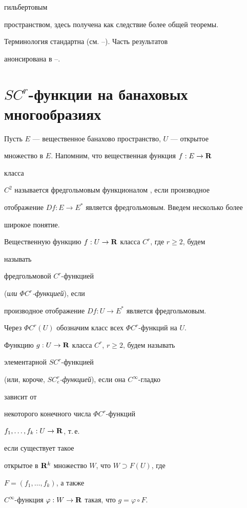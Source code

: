 гильбертовым


пространством, здесь получена как следствие более общей теоремы.


Терминология стандартна (см. \cite{6}--\cite{9}). Часть результатов


анонсирована в \cite{10}--\cite{13}.





\section{$SC^r$-функции на банаховых многообразиях}





Пусть $E$ --- вещественное банахово пространство, $U$ --- открытое


множество в $E$. Напомним, что вещественная функция $f:E\to\bold R$


класса


$C^2$ называется фредгольмовым функционалом \cite{14}, если производное


отображение $Df:E\to E^*$ является фредгольмовым. Введем несколько более


широкое понятие.





\begin{defns}


Вещественную функцию $f:U\to\bold R$ класса $C^r$, где $r\ge 2$, будем


называть {\em


фредгольмовой $C^r$-функцией} ({\em или $\Phi C^r$-функцией}), если


производное отображение $Df:U\to E^*$ является фредгольмовым.


\end{defns}





Через $\Phi C^r(U)$ обозначим класс всех $\Phi C^r$-функций на $U$.





\begin{defns}


Функцию $g:U\to\bold R$ класса $C^r$, $r\ge 2$, будем называть {\em


элементарной $SC^r$-функцией}


(или, короче, {\em $SC^r_e$-функцией}), если она $C^\infty$-гладко


зависит от


некоторого конечного числа $\Phi C^r$-функций


$f_1,\dotsc,f_k:U\to\bold R$, т.\,е.


если существует такое


открытое в $\bold R^k$ множество $W$, что $W\supset F(U)$, где


$F=(f_1,\dotsc,f_k)$, а также


$C^\infty$-функция $\varphi:W\to\bold R$ такая, что $g=\varphi\circ F$.


\end{defns}





